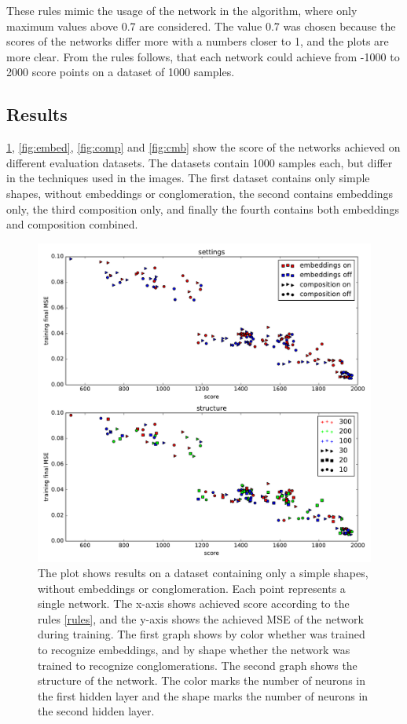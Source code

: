 These rules \label{rules} mimic the usage of the network in the algorithm, where only maximum values above 0.7 are considered. The value 0.7 was chosen because the scores of the networks differ more with a numbers closer to 1, and the plots are more clear. From the rules follows, that each network could achieve from -1000 to 2000 score points on a dataset of 1000 samples.

\subsection{Results}
\cref{fig:simples}, \cref{fig:embed}, \cref{fig:comp} and \cref{fig:cmb} show the score of the networks achieved on different evaluation datasets. The datasets contain 1000 samples each, but differ in the techniques used in the images. The first dataset contains only simple shapes, without embeddings or conglomeration, the second contains embeddings only, the third composition only, and finally the fourth contains both embeddings and composition combined.

\begin{figure}
\centering
\includegraphics[width=\linewidth]{ext/figure_simples_cmb.pdf}
\caption{The plot shows results on a dataset containing only a simple shapes, without embeddings or conglomeration. Each point represents a single network. The x-axis shows achieved score according to the rules \ref{rules}, and the y-axis shows the achieved MSE of the network during training.
The first graph shows by color whether was trained to recognize embeddings, and by shape whether the network was trained to recognize conglomerations.
The second graph shows the structure of the network. The color marks the number of neurons in the first hidden layer and the shape marks the number of neurons in the second hidden layer.}
\label{fig:simples}
\end{figure}

